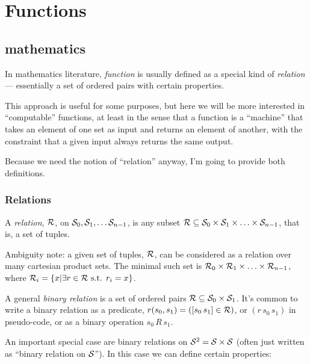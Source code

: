 \chapter{Functions}\label{ch:Functions}

\section{mathematics}

In mathematics literature, \textit{function} is usually defined as
a special kind of \textit{relation} --- essentially a set of
ordered pairs with certain properties.

This approach is useful for some purposes, but here we will be
more interested in ``computable'' functions, at least in the sense
that a function is a ``machine'' that takes an element of one set
as input and returns an element of another, with the constraint
that a given input always returns the same output.

Because we need the notion of ``relation'' anyway, I'm going to
provide both definitions.

\subsection{Relations}

A \textit{relation}, 
$\mathcal{R}$, on $\mathcal{S}_0, \mathcal{S}_1, \ldots \mathcal{S}_{n-1}$,  
is any subset 
$\mathcal{R} \subseteq \mathcal{S}_0 \times \mathcal{S}_1 \times \ldots 
\times \mathcal{S}_{n-1}$,
that is, a set of tuples.

Ambiguity note: a given set of tuples, $\mathcal{R}$, can be
considered as a relation over many cartesian product sets.
The minimal such set is 
$\mathcal{R}_0 \times \mathcal{R}_1 \times \ldots \times
\mathcal{R}_{n-1}$, 
where 
$\mathcal{R}_i = \{ x | \exists r 
\in \mathcal{R} \text{ s.t. } r_i = x\}$.

A general \textit{binary relation} is a set of ordered
pairs $\mathcal{R} \subseteq \mathcal{S}_0 \times \mathcal{S}_1$.
It's common to write a binary relation as a predicate, 
$r(s_0,s_1) = ([s_0 \, s_1] \in \mathcal{R})$,
or $(r \, s_0 \, s_1)$ in pseudo-code,
or as a binary operation $s_0 \, R \, s_1$.

An important special case
are binary relations on $\mathcal{S}^2 = \mathcal{S} \times \mathcal{S}$
(often just written as ``binary relation on $\mathcal{S}$''). 
In this case we can define certain properties:

